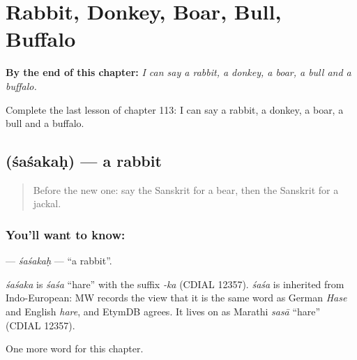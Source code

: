 
\chapter{Rabbit, Donkey, Boar, Bull, Buffalo}
\label{ch:sa-rabbit-donkey-boar-bull-buffalo}

\begin{chapteropening}
\textbf{By the end of this chapter:} \emph{I can say a rabbit, a donkey, a boar, a bull and a buffalo.}

Complete the last lesson of chapter 113: I can say a rabbit, a donkey, a boar, a bull and a buffalo.
\end{chapteropening}

\section[\texorpdfstring{\sk{शशकः} (śaśakaḥ)}{शशकः (śaśakaḥ)}]{ (śaśakaḥ) — a rabbit}

\label{lesson:SA-C113-sasakah}



\begin{quote}
Before the new one: say the Sanskrit for a bear, then the Sanskrit for a jackal.
\end{quote}

\subsection*{You'll want to know: }
\textbf{} — \emph{śaśakaḥ} — \textquotedblleft{}a rabbit\textquotedblright{}.

\begin{cousinweb}
\emph{śaśaka} is \emph{śaśa} \textquotedblleft{}hare\textquotedblright{} with the suffix \emph{-ka} (CDIAL 12357). \emph{śaśa} is inherited from Indo-European: MW records the view that it is the same word as German \emph{Hase} and English \emph{hare}, and EtymDB agrees. It lives on as Marathi \emph{sasā} \textquotedblleft{}hare\textquotedblright{} (CDIAL 12357).
\end{cousinweb}

\begin{grammarlens}[title={What you've built}]
One more word for this chapter.
\end{grammarlens}

